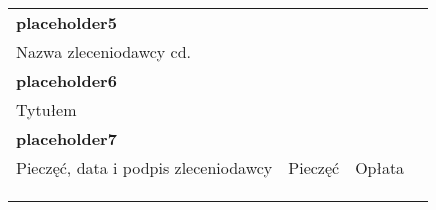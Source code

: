 \documentclass{article}
\begin{document}
\begin{table}[h]
{\begin{tabularx}{\textwidth}{|Xccll|c|}
\multicolumn{5}{|l|}{\textbf{placeholder5}}                                                       &                                             \\
\multicolumn{5}{|l|}{Nazwa zleceniodawcy cd.}                                                                           &                                             \\
\multicolumn{5}{|l|}{\textbf{placeholder6}}                                                             &                                             \\
\multicolumn{5}{|l|}{Tytułem}                                                                                           &                                             \\
\multicolumn{5}{|l|}{\textbf{placeholder7}}                                                                                               &                                             \\ \cline{1-5}
\multicolumn{3}{|l|}{Pieczęć, data i podpis zleceniodawcy} & \multicolumn{1}{l|}{Pieczęć}           & Opłata  \hspace{20px}          &                                             \\ \cline{1-5}
\multicolumn{3}{|l|}{\multirow{3}{*}{}}                    & \multicolumn{1}{l|}{\multirow{3}{*}{}} & \multirow{3}{*}{} &                                             \\
\multicolumn{3}{|l|}{}                                     & \multicolumn{1}{l|}{}                  &                   &                                             \\
\multicolumn{3}{|l|}{}                                     & \multicolumn{1}{l|}{}                               &                   &                                             \\ \hline
\end{tabularx}
}
\end{table}
\end{document}
